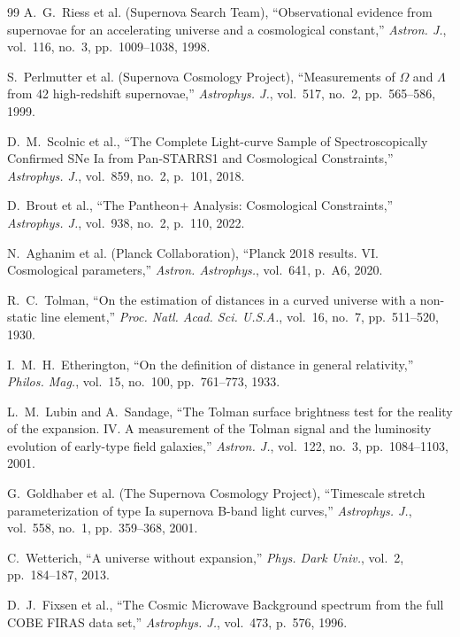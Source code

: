 \documentclass[11pt,a4paper]{article}
\begin{document}
\begin{thebibliography}{99}
    A.~G.~Riess et al. (Supernova Search Team), ``Observational evidence from supernovae for an accelerating universe and a cosmological constant,'' \textit{Astron. J.}, vol.~116, no.~3, pp.~1009--1038, 1998.

    S.~Perlmutter et al. (Supernova Cosmology Project), ``Measurements of $\Omega$ and $\Lambda$ from 42 high-redshift supernovae,'' \textit{Astrophys. J.}, vol.~517, no.~2, pp.~565--586, 1999.

    D.~M.~Scolnic et al., ``The Complete Light-curve Sample of Spectroscopically Confirmed SNe Ia from Pan-STARRS1 and Cosmological Constraints,'' \textit{Astrophys. J.}, vol.~859, no.~2, p.~101, 2018.

    D.~Brout et al., ``The Pantheon+ Analysis: Cosmological Constraints,'' \textit{Astrophys. J.}, vol.~938, no.~2, p.~110, 2022.

    N.~Aghanim et al. (Planck Collaboration), ``Planck 2018 results. VI. Cosmological parameters,'' \textit{Astron. Astrophys.}, vol.~641, p.~A6, 2020.

    R.~C.~Tolman, ``On the estimation of distances in a curved universe with a non-static line element,'' \textit{Proc. Natl. Acad. Sci. U.S.A.}, vol.~16, no.~7, pp.~511--520, 1930.

    I.~M.~H.~Etherington, ``On the definition of distance in general relativity,'' \textit{Philos. Mag.}, vol.~15, no.~100, pp.~761--773, 1933.

    L.~M.~Lubin and A.~Sandage, ``The Tolman surface brightness test for the reality of the expansion. IV. A measurement of the Tolman signal and the luminosity evolution of early-type field galaxies,'' \textit{Astron. J.}, vol.~122, no.~3, pp.~1084--1103, 2001.

    G.~Goldhaber et al. (The Supernova Cosmology Project), ``Timescale stretch parameterization of type Ia supernova B-band light curves,'' \textit{Astrophys. J.}, vol.~558, no.~1, pp.~359--368, 2001.

    C.~Wetterich, ``A universe without expansion,'' \textit{Phys. Dark Univ.}, vol.~2, pp.~184--187, 2013.

    D.~J.~Fixsen et al., ``The Cosmic Microwave Background spectrum from the full COBE FIRAS data set,'' \textit{Astrophys. J.}, vol.~473, p.~576, 1996.


\end{thebibliography}
\end{document}
